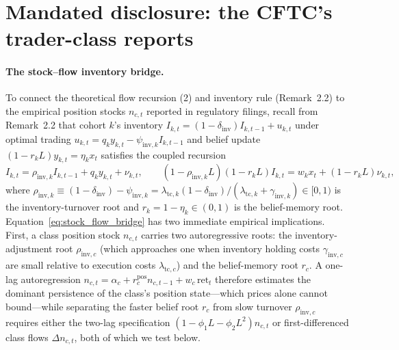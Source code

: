 \documentclass[12pt]{article}
\theoremstyle{definition}
\theoremstyle{remark}
\begin{document}
\section{Mandated disclosure: the CFTC's trader-class reports}\label{sec:cot}

\paragraph{The stock--flow inventory bridge.} To connect the theoretical flow recursion (2) and inventory rule (Remark~2.2) to the empirical position stocks $n_{c,t}$ reported in regulatory filings, recall from Remark~2.2 that cohort $k$'s inventory $I_{k,t}=(1-\delta_{\mathrm{inv}})I_{k,t-1}+u_{k,t}$ under optimal trading $u_{k,t}=q_k y_{k,t}-\psi_{\mathrm{inv},k}I_{k,t-1}$ and belief update $(1-r_k L)y_{k,t}=\eta_k x_t$ satisfies the coupled recursion
\begin{equation}
I_{k,t}=\rho_{\mathrm{inv},k}I_{k,t-1}+q_k y_{k,t}+\nu_{k,t},\qquad (1-\rho_{\mathrm{inv},k}L)(1-r_k L)I_{k,t}=w_k x_t+(1-r_k L)\nu_{k,t},
\label{eq:stock_flow_bridge}
\end{equation}
where $\rho_{\mathrm{inv},k}\equiv (1-\delta_{\mathrm{inv}})-\psi_{\mathrm{inv},k}=\lambda_{\mathrm{tc},k}(1-\delta_{\mathrm{inv}})/(\lambda_{\mathrm{tc},k}+\gamma_{\mathrm{inv},k})\in[0,1)$ is the inventory-turnover root and $r_k=1-\eta_k\in(0,1)$ is the belief-memory root. Equation~\eqref{eq:stock_flow_bridge} has two immediate empirical implications. First, a class position stock $n_{c,t}$ carries two autoregressive roots: the inventory-adjustment root $\rho_{\mathrm{inv},c}$ (which approaches one when inventory holding costs $\gamma_{\mathrm{inv},c}$ are small relative to execution costs $\lambda_{\mathrm{tc},c}$) and the belief-memory root $r_c$. A one-lag autoregression $n_{c,t}=\alpha_c+r_c^{\mathrm{pos}}n_{c,t-1}+w_c\,\mathrm{ret}_t$ therefore estimates the dominant persistence of the class's position state---which prices alone cannot bound---while separating the faster belief root $r_c$ from slow turnover $\rho_{\mathrm{inv},c}$ requires either the two-lag specification $(1-\phi_1 L-\phi_2 L^2)n_{c,t}$ or first-differenced class flows $\Delta n_{c,t}$, both of which we test below.
\end{document}
